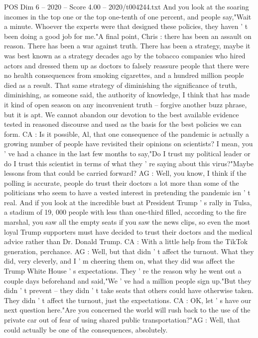 \begin{textsample}{POS Dim 6 – 2020 – Score 4.00 – 2020/t004244.txt}
And you look at the soaring incomes in the top one or the top one-tenth of one percent, and people say,"Wait a minute.
Whoever the experts were that designed these policies, they haven ' t been doing a good job for me."A final point, Chris : there has been an assault on reason.
There has been a war against truth.
There has been a strategy, maybe it was best known as a strategy decades ago by the tobacco companies who hired actors and dressed them up as doctors to falsely reassure people that there were no health consequences from smoking cigarettes, and a hundred million people died as a result.
That same strategy of diminishing the significance of truth, diminishing, as someone said, the authority of knowledge, I think that has made it kind of open season on any inconvenient truth -- forgive another buzz phrase, but it is apt.
We cannot abandon our devotion to the best available evidence tested in reasoned discourse and used as the basis for the best policies we can form.
CA : Is it possible, Al, that one consequence of the pandemic is actually a growing number of people have revisited their opinions on scientists?
I mean, you ' ve had a chance in the last few months to say,"Do I trust my political leader or do I trust this scientist in terms of what they ' re saying about this virus?"Maybe lessons from that could be carried forward?
AG : Well, you know, I think if the polling is accurate, people do trust their doctors a lot more than some of the politicians who seem to have a vested interest in pretending the pandemic isn ' t real.
And if you look at the incredible bust at President Trump ' s rally in Tulsa, a stadium of 19, 000 people with less than one-third filled, according to the fire marshal, you saw all the empty seats if you saw the news clips, so even the most loyal Trump supporters must have decided to trust their doctors and the medical advice rather than Dr.
Donald Trump.
CA : With a little help from the TikTok generation, perchance.
AG : Well, but that didn ' t affect the turnout.
What they did, very cleverly, and I ' m cheering them on, what they did was affect the Trump White House ' s expectations.
They ' re the reason why he went out a couple days beforehand and said,"We ' ve had a million people sign up."But they didn ' t prevent -- they didn ' t take seats that others could have otherwise taken.
They didn ' t affect the turnout, just the expectations.
CA : OK, let ' s have our next question here."Are you concerned the world will rush back to the use of the private car out of fear of using shared public transportation?"AG : Well, that could actually be one of the consequences, absolutely.

\end{textsample}
